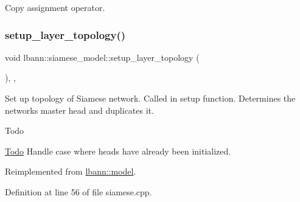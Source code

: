 Copy assignment operator. \mbox{\label{classlbann_1_1siamese__model_a7ff41cffb060500605124959f1a2a6cf}} 
\subsubsection{\texorpdfstring{setup\+\_\+layer\+\_\+topology()}{setup\_layer\_topology()}}
{\footnotesize\ttfamily void lbann\+::siamese\+\_\+model\+::setup\+\_\+layer\+\_\+topology (\begin{DoxyParamCaption}{ }\end{DoxyParamCaption})\hspace{0.3cm}{\ttfamily [override]}, {\ttfamily [protected]}, {\ttfamily [virtual]}}

Set up topology of Siamese network. Called in setup function. Determines the network\textquotesingle{}s master head and duplicates it. \begin{DoxyRefDesc}{Todo}
\item[\hyperlink{todo__todo000003}{Todo}]Handle case where heads have already been initialized. \end{DoxyRefDesc}


Reimplemented from \hyperlink{classlbann_1_1model_a7b3e2a643c658dcaa7478d2568f29784}{lbann\+::model}.



Definition at line 56 of file siamese.\+cpp.


